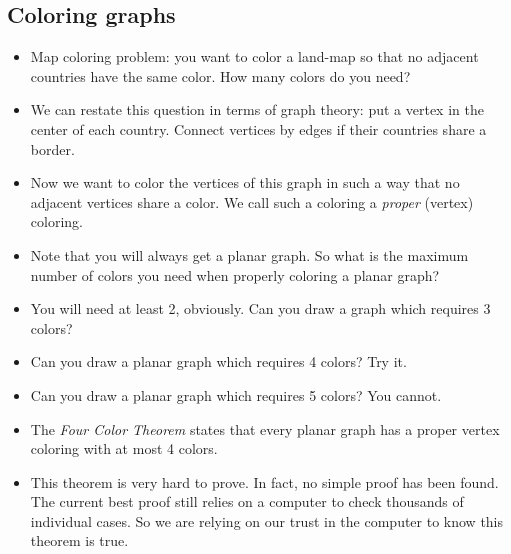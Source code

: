 \subsection*{Coloring graphs}
\begin{itemize}
  \item Map coloring problem: you want to color a land-map so that no adjacent countries have the same color.  How many colors do you need?
  \item We can restate this question in terms of graph theory: put a vertex in the center of each country.  Connect vertices by edges if their countries share a border.
  \item Now we want to color the vertices of this graph in such a way that no adjacent vertices share a color.  We call such a coloring a {\em proper} (vertex) coloring.
  \item Note that you will always get a planar graph.  So what is the maximum number of colors you need when properly coloring a planar graph?
  \item You will need at least 2, obviously.  Can you draw a graph which requires 3 colors?
  \item Can you draw a planar graph which requires 4 colors?  Try it.
  \item Can you draw a planar graph which requires 5 colors? You cannot.
  \item The {\em Four Color Theorem} states that every planar graph has a proper vertex coloring with at most 4 colors.
  \item This theorem is very hard to prove.  In fact, no simple proof has been found.  The current best proof still relies on a computer to check thousands of individual cases.  So we are relying on our trust in the computer to know this theorem is true.
\end{itemize}
